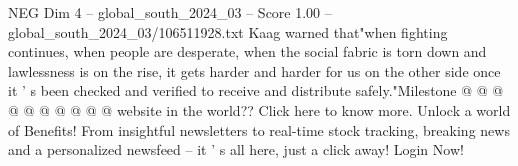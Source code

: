 \begin{textsample}{NEG Dim 4 – global\_south\_2024\_03 – Score 1.00 – global\_south\_2024\_03/106511928.txt}
Kaag warned that"when fighting continues, when people are desperate, when the social fabric is torn down and lawlessness is on the rise, it gets harder and harder for us on the other side once it ' s been checked and verified to receive and distribute safely."Milestone @ @ @ @ @ @ @ @ @ @ website in the world??
Click here to know more.
Unlock a world of Benefits!
From insightful newsletters to real-time stock tracking, breaking news and a personalized newsfeed -- it ' s all here, just a click away!
Login Now!

\end{textsample}
